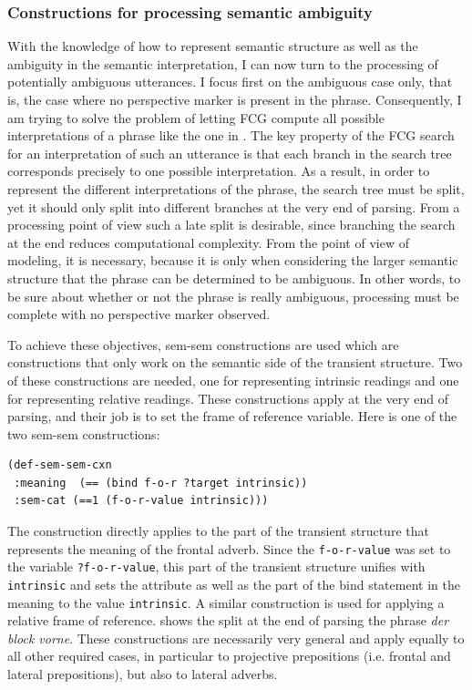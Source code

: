 \subsubsection{Constructions for processing semantic ambiguity}
With the knowledge of how to represent semantic structure as well as the 
ambiguity in the semantic interpretation, 
I can now turn to the processing of potentially ambiguous utterances.
I focus first on the ambiguous case only, that is, the case where no 
perspective marker is present in the 
phrase. Consequently, I am trying to solve the problem of 
letting FCG compute all possible interpretations of a
phrase like the one in . 
The key property of the FCG search for an interpretation 
of such an utterance is that each branch in the search tree corresponds 
precisely to one possible interpretation. As a result,
in order to represent the different interpretations of the phrase, the search tree 
must be split, yet it should only split into different branches at the very end of parsing. 
From a processing point of view such a late split is desirable, since branching the 
search at the end reduces computational complexity. From the point of view of modeling, 
it is necessary, because it is only when considering the larger semantic structure
that the phrase can be determined to be ambiguous. In other words, to be sure about 
whether or not the phrase is really ambiguous, processing must be complete 
with no perspective marker observed.

To achieve these objectives, sem-sem constructions are used which
are constructions that only work on the semantic side of the transient structure.
Two of these constructions are needed, one for representing intrinsic readings and 
one for representing relative readings. 
These constructions apply at the very end of parsing, and their job is to set the frame of reference variable.
Here is one of the two sem-sem constructions:
\ea
\label{e:def-sem-sem-intrinsic}
\begin{lstlisting}
(def-sem-sem-cxn 
 :meaning  (== (bind f-o-r ?target intrinsic))
 :sem-cat (==1 (f-o-r-value intrinsic)))
\end{lstlisting}
\z
The construction directly applies to the part of the transient 
structure that represents the meaning of the frontal
adverb. Since the {\footnotesize\tt f-o-r-value} was set to the variable {\footnotesize\tt ?f-o-r-value}, this part of the 
transient structure unifies with {\footnotesize\tt intrinsic} and sets the attribute 
as well as the part of the bind statement
in the meaning to the value {\footnotesize\tt intrinsic}. A similar construction is 
used for applying a relative frame of reference.  shows the split at the end 
of parsing the phrase \textit{der block vorne}.
These constructions are necessarily very general and apply equally to 
all other required cases, in particular to projective prepositions (i.e. frontal and 
lateral prepositions), but also to lateral adverbs.


